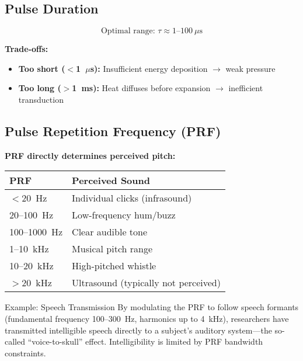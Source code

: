 \subsection{Pulse Duration}

\begin{equation}
\text{Optimal range: } \tau \approx 1\text{--}100~\mu\text{s}
\label{eq:frey-pulse-width}
\end{equation}

\textbf{Trade-offs:}
\begin{itemize}
\item \textbf{Too short ($<$1~$\mu$s):} Insufficient energy deposition $\rightarrow$ weak pressure
\item \textbf{Too long ($>$1~ms):} Heat diffuses before expansion $\rightarrow$ inefficient transduction
\end{itemize}

\subsection{Pulse Repetition Frequency (PRF)}

\textbf{PRF directly determines perceived pitch:}

\begin{center}
\begin{tabular}{@{}ll@{}}
\toprule
\textbf{PRF} & \textbf{Perceived Sound} \\
\midrule
$<$20~Hz & Individual clicks (infrasound) \\
20--100~Hz & Low-frequency hum/buzz \\
100--1000~Hz & Clear audible tone \\
1--10~kHz & Musical pitch range \\
10--20~kHz & High-pitched whistle \\
$>$20~kHz & Ultrasound (typically not perceived) \\
\bottomrule
\end{tabular}
\end{center}

\begin{calloutbox}{Example: Speech Transmission}
By modulating the PRF to follow speech formants (fundamental frequency 100--300~Hz, harmonics up to 4~kHz), researchers have transmitted intelligible speech directly to a subject's auditory system---the so-called ``voice-to-skull'' effect. Intelligibility is limited by PRF bandwidth constraints.
\end{calloutbox}

